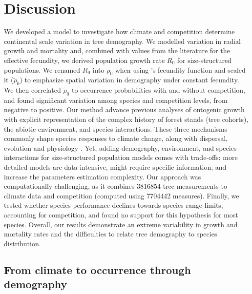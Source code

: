

\section{Discussion}
We developed a model to investigate how climate and competition determine continental scale variation in tree demography. We modelled variation in radial growth and mortality and, combined with values from the literature for the effective fecundity, we derived population growth rate $ R_0 $ for size-structured populations. We renamed $ R_0 $ into $ \rho_0 $ when using \citet{Purves2008}'s fecundity function and scaled it (\ie $ \tilde \rho_0 $) to emphasize spatial variation in demography under constant fecundity. We then correlated $ \tilde \rho_0 $ to occurrence probabilities with and without competition, and found significant variation among species and competition levels, from negative to positive. Our method advance previous analyses of ontogenic growth \citep{McGill2012, Thuiller2014} with explicit representation of the complex history of forest stands (\ie tree cohorts), the abiotic environment, and species interactions. These three mechanisms commonly shape species responses to climate change, along with dispersal, evolution and physiology \citep{Urban2016}. Yet, adding demography, environment, and species interactions for size-structured population models comes with trade-offs: more detailed models are data-intensive, might require specific information, and increase the parameters estimation complexity. Our approach was computationally challenging, as it combines \num{3816854} tree measurements to climate data and competition (computed using \num{7704442} measures). Finally, we tested whether species performance declines towards species range limits, accounting for competition, and found no support for this hypothesis for most species. Overall, our results demonstrate an extreme variability in growth and mortality rates and the difficulties to relate tree demography to species distribution.

\subsection{From climate to occurrence through demography}
